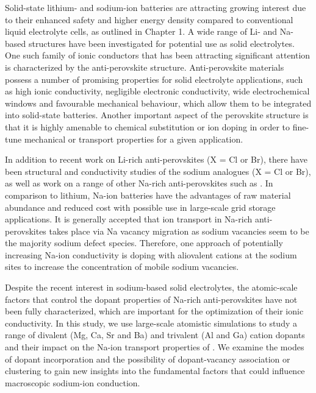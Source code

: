 \documentclass[12pt]{report}
\begin{document}
Solid-state lithium- and sodium-ion batteries are attracting growing interest due to their enhanced safety and higher energy density compared to conventional liquid electrolyte cells, as outlined in Chapter 1.\cite{famprikis2019, zhang2018b, ohno2020, bachman2016, manthiram2017, gao2018, kim2017, zhao2018, dawson2018b}
A wide range of Li- and Na-based structures have been investigated for potential use as solid electrolytes.  
One such family of ionic conductors that has been attracting significant attention is characterized by the anti-perovskite structure.  
Anti-perovskite materials possess a number of promising properties for solid electrolyte applications, such as high ionic conductivity, negligible electronic conductivity, wide electrochemical windows\cite{dawson2021, wang2020b} and favourable mechanical behaviour,\cite{khandy2020, sattar2021, lv2017, deng2016, wang2016b, ramanna2013, zinenko2012} which allow them to be integrated into solid-state batteries. 
Another important aspect of the perovskite structure is that it is highly amenable to chemical substitution or ion doping in order to fine-tune mechanical or transport properties for a given application. 

In addition to recent work on Li-rich anti-perovskites  (X = Cl or Br),\cite{zhao2012, emly2013, dawson2018a, clarke2021, shen2020} there have been structural and conductivity studies of the sodium analogues  (X = Cl or Br)\cite{sabrowsky1988, hippler1990, wang2015a, zhu2016, nguyen2016, wan2018, dawson2018c, pham2018, kim2019, ahiavi2020, lin2020, li2021}, as well as work on a range of other Na-rich anti-perovskites such as .\cite{jansen1977, fanfani1980, muller1990, jansen1992, avdontceva2015, fang2018, sun2019, gao2020, fan2020, yin2020, gao2021, sabrowsky1990, hippler1990b, yu2018, yu2019, lu2020}
In comparison to lithium, Na-ion batteries have the advantages of raw material abundance and reduced cost with possible use in large-scale grid storage applications. 
It is generally accepted that ion transport in Na-rich anti-perovskites takes place via Na vacancy migration\cite{zhu2016} as sodium vacancies seem to be the majority sodium defect species.  Therefore, one approach of potentially increasing Na-ion conductivity is doping with aliovalent cations at the sodium sites to increase the concentration of mobile sodium vacancies.\cite{wang2015a, wan2018}  

Despite the recent interest in sodium-based solid electrolytes,\cite{kim2017, zhao2018} the atomic-scale factors that control the dopant properties of Na-rich anti-perovskites have not been fully characterized, which are important for the optimization of their ionic conductivity. 
In this study, we use large-scale atomistic simulations to study a range of divalent (Mg, Ca, Sr and Ba) and trivalent (Al and Ga) cation dopants and their impact on the Na-ion transport properties of . 
We examine the modes of dopant incorporation and the possibility of dopant-vacancy association or clustering to gain new insights into the fundamental factors that could influence macroscopic sodium-ion conduction. 
\end{document}
